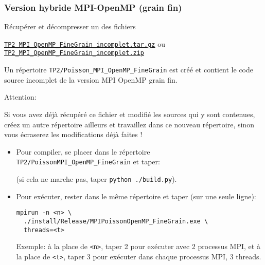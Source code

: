 \documentclass{beamer}
\begin{document}
\begin{frame}[fragile]
	\frametitle{Version hybride MPI-OpenMP (grain fin)}
	
Récupérer et décompresser un des fichiers \bigskip

\href{https://perso.ensta-paris.fr/~tajchman/Seance5/TP2_MPI_OpenMP_FineGrain_incomplet.tar.gz}{\tt TP2\_MPI\_OpenMP\_FineGrain\_incomplet.tar.gz} ou \href{https://perso.ensta-paris.fr/~tajchman/Seance5/TP2_MPI_OpenMP_FineGrain_incomplet.zip}{\tt TP2\_MPI\_OpenMP\_FineGrain\_incomplet.zip}
\bigskip

Un répertoire {\tt TP2/Poisson\_MPI\_OpenMP\_FineGrain} est créé et contient le code source incomplet de la version MPI OpenMP grain fin.
 
\vfill
{\color{red}
	Attention:
	\bigskip
	
	\begin{minipage}{\textwidth}\color{red}
Si vous avez déjà récupéré ce fichier et modifié les sources qui y sont contenues, créez un autre répertoire ailleurs et travaillez dans ce nouveau répertoire, sinon vous écraserez les modifications déjà faites !
	\end{minipage}
}
\vfill
\end{frame}

\begin{frame}[fragile]

\begin{itemize}
	\item 	Pour compiler, se placer dans le répertoire {\tt TP2/PoissonMPI\_OpenMP\_FineGrain} et taper:
	
	
	\vfill
	(si cela ne marche pas, taper \verb|python ./build.py|).
	
	\vfill
	\item Pour exécuter, rester dans le même répertoire et taper (sur une seule ligne):
	
	\hspace{2cm}
	{\color{blue}\begin{verbatim}
mpirun -n <n> \
  ./install/Release/MPIPoissonOpenMP_FineGrain.exe \
  threads=<t>
\end{verbatim}
	}
	
	\vfill
	Exemple: à la place de {\tt <n>}, taper 2 pour exécuter avec 2 processus MPI, et à la place de {\tt <t>}, taper 3 pour exécuter dans chaque processus MPI, 3 threads.
	\vfill
	
\end{itemize}
\end{frame}
\end{document}
